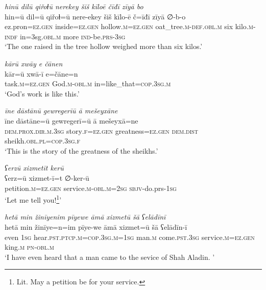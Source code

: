 \ea \label{ZB.52}
\textit{hinū dilū qiřoɫū nerekey šiš kīloē čīđī zīyā bo} \\ 
\gll hin=ū dil=ū qiřoɫ=ū nere-ekey šiš kīlo-ē č=īđī zīyā ∅-b-o \\ 
 ez.pron\textsc{\textsc{=ez.gen}} inside\textsc{\textsc{=ez.gen}} hollow\textsc{.m}\textsc{\textsc{=ez.gen}} oat\_tree\textsc{.m}\textsc{-def}\textsc{.obl}\textsc{.m} six kilo\textsc{.m}\textsc{-indf} in=3sg\textsc{.obl}\textsc{.m} more \textsc{ind-}be\textsc{.prs}\textsc{-3sg} \\ 
\glt `The one raised in the tree hollow weighed more than six kilos.'
\z 
 
\ea \label{ZB.53}
\textit{kārū xwāy e čānen} \\ 
\gll kār=ū xwā-ī e=čāne=n \\ 
 task\textsc{.m}\textsc{\textsc{=ez.gen}} God\textsc{.m}\textsc{-obl}\textsc{.m} in=like\_that\textsc{=cop}\textsc{.3sg}\textsc{.m} \\ 
\glt `God’s work is like this.'
\z 
 
\ea \label{ZB.58}
\textit{īne dāstānū gewregerīū ā mešeyxāne} \\ 
\gll īne dāstāne=ū gewregerī=ū ā mešeyxā=ne \\ 
 \textsc{dem.prox}\textsc{.dir}\textsc{.m}\textsc{.3sg} story\textsc{.f}\textsc{\textsc{=ez.gen}} greatness\textsc{\textsc{=ez.gen}} \textsc{dem.dist} sheikh\textsc{.obl}\textsc{.pl}\textsc{=cop}\textsc{.3sg}\textsc{.f} \\ 
\glt `This is the story of the greatness of the sheikhs.'
\z 
 
\ea \label{ZQ.1}
\textit{ʕerzū xizmetīt kerū} \\ 
\gll ʕerz=ū xizmet-ī=t ∅-ker-ū \\ 
 petition\textsc{.m}\textsc{=ez.gen} service\textsc{.m}\textsc{-obl}\textsc{.m}\textsc{=\textsc{2sg}} \textsc{sbjv-}do.prs\textsc{-\textsc{1sg}} \\ 
\glt `Let me tell you!\footnote{Lit. May a petition be for your service.}'
\z 
 
\ea \label{ZQ.2}
\textit{hetā min žinīyenim pīyewe āmā xizmetū šā ʕelādīnī} \\ 
\gll hetā min žinīye=n=im pīye-we āmā xizmet=ū šā ʕelādīn-ī \\ 
 even \textsc{1sg} hear\textsc{.pst}\textsc{.ptcp}\textsc{.m}\textsc{=cop}\textsc{.3sg}\textsc{.m}\textsc{=\textsc{1sg}} man\textsc{.m} come\textsc{.pst}\textsc{.3sg} service\textsc{.m}\textsc{=ez.gen} king\textsc{.m} \textsc{pn}\textsc{-obl}\textsc{.m} \\ 
\glt `I have even heard that a man came to the sevice of Shah Aladin. '
\z 
 
